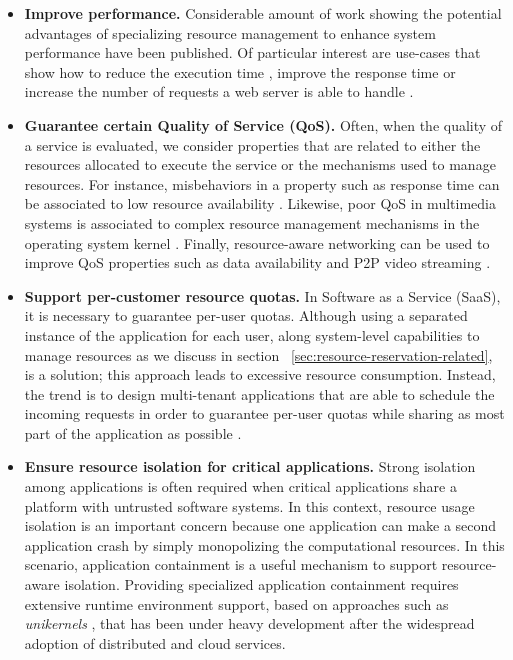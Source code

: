\begin{itemize}
\item \textbf{Improve performance.}
Considerable amount of work showing the potential advantages of specializing resource management to enhance system performance have been published.
Of particular interest are use-cases that show how to reduce the execution time \cite{Polo:2011:RAS:2414338.2414352}, improve the response time \cite{no se} or increase the number of requests a web server is able to handle \cite{engler1995exokernel,Belay:2014:IPD:2685048.2685053}.

\item \textbf{Guarantee certain Quality of Service (QoS).} 
Often, when the quality of a service is evaluated, we consider properties that are related to either the resources allocated to execute the service or the mechanisms used to manage resources.
For instance, misbehaviors in a property such as response time can be associated to low resource availability \cite{uno aquji,Chechik-2009}.
Likewise, poor QoS in multimedia systems is associated to complex resource management mechanisms in the operating system kernel \cite{Black1997}.
Finally, resource-aware networking can be used to improve QoS properties such as data availability \cite{Boldrini:2008:CRA:1549824.1550106} and P2P video streaming \cite{Pianese:2007:RLA:1326320.1326323,Alhaisoni:2010:RTO:1664767.1664770}.

\item \textbf{Support per-customer resource quotas.}
In Software as a Service (SaaS), it is necessary to guarantee per-user quotas.
Although using a separated instance of the application for each user, along system-level capabilities to manage resources as we discuss in section ~\ref{sec:resource-reservation-related}, is a solution; this approach leads to excessive resource consumption.
Instead, the trend is to design multi-tenant applications that are able to schedule the incoming requests in order to guarantee per-user quotas while sharing as most part of the application as possible \cite{KrSpAhKo2014_CCGrid_ResourceIsolation,KrWeKo2013-icwe-MTBenchmark}.    

\item \textbf{Ensure resource isolation for critical applications.}
Strong isolation among applications is often required when critical applications \cite{Knight:2002:SCS:581339.581406} share a platform with untrusted software systems.
In this context, resource usage isolation is an important concern because one application can make a second application crash by simply monopolizing the computational resources.
In this scenario, application containment \cite{Kamp00jails:confining,Soltesz:2007:COS:1272998.1273025,Madhavapeddy:2015:JJS:2789770.2789809} is a useful mechanism to support resource-aware isolation.
Providing specialized application containment requires extensive runtime environment support, based on approaches such as \textit{unikernels} \cite{Madhavapeddy:2013:ULO:2499368.2451167,Kivity:2014:OVO:2643634.2643642}, that has been under heavy development after the widespread adoption of distributed and cloud services.  

\end{itemize}

